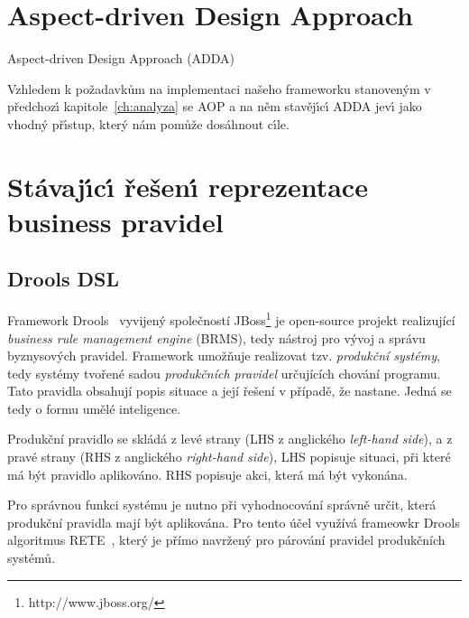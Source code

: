 \section{Aspect-driven Design Approach}


Aspect-driven Design Approach (\gls{ADDA})

Vzhledem k požadavkům na implementaci našeho frameworku stanoven\'ym
v předchoz\'{\i} kapitole~\ref{ch:analyza} se \gls{AOP} a na něm stavěj\'{\i}c\'{\i} \gls{ADDA}
jev\'{\i} jako vhodn\'y př\'{\i}stup, kter\'y nám pomůže dosáhnout c\'{\i}le.

\section{Stávaj\'{\i}c\'{\i} řešen\'{\i} reprezentace business pravidel}

\subsection{Drools DSL}

Framework Drools~\cite{drools} vyvijený společností JBoss\footnote{http://www.jboss.org/}
je open-source projekt realizující \textit{business rule management engine} (\gls{BRMS}),
tedy nástroj pro vývoj a správu byznysových pravidel. Framework umožňuje realizovat
tzv. \textit{produkční systémy}, tedy systémy tvořené sadou \textit{produkčních pravidel}
určujících chování programu. Tato pravidla obsahují popis situace a její řešení v případě,
že nastane. Jedná se tedy o formu umělé inteligence.

Produkční pravidlo se skládá z levé strany (\gls{LHS} z anglického \textit{left-hand side}),
a z pravé strany (\gls{RHS} z anglického \textit{right-hand side}),
\gls{LHS} popisuje situaci, při které má být pravidlo aplikováno. \gls{RHS} popisuje akci,
která má být vykonána.

Pro správnou funkci systému je nutno při vyhodnocování správně určit, která produkční pravidla
mají být aplikována. Pro tento účel využívá frameowkr Drools algoritmus RETE~\cite{forgy1988rete},
který je přímo navržený pro párování pravidel produkčních systémů.


